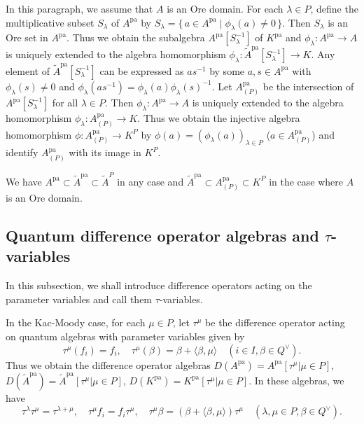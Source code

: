 \documentclass[12pt,twoside]{article}
\newcommand\bra{\langle}
\newcommand\ket{\rangle}
\newcommand\Qv{Q^\vee}
\newcommand\tA{{\widetilde A}}
\newcommand\pa{{\mathrm{pa}}}
\theoremstyle{plain} %
\theoremstyle{definition} %
\theoremstyle{definition} %
\numberwithin{theorem}{section}
\numberwithin{equation}{section}
\numberwithin{figure}{section}
\numberwithin{table}{section}
\begin{document}
In this paragraph, we assume that $A$ is an Ore domain.
For each $\lambda\in P$, 
define the multiplicative subset $S_\lambda$ of $A^\pa$ 
by $S_\lambda=\{\,a\in A^\pa\mid\phi_\lambda(a)\ne0\,\}$.
Then $S_\lambda$ is an Ore set in $A^\pa$.
Thus we obtain the subalgebra $A^\pa[S_\lambda^{-1}]$ of $K^\pa$
and $\phi_\lambda:A^\pa\to A$ is uniquely extended to 
the algebra homomorphism $\phi_\lambda:\tA^\pa[S_\lambda^{-1}]\to K$.
Any element of $\tA^\pa[S_\lambda^{-1}]$ can be expressed as 
$as^{-1}$ by some $a,s\in A^\pa$ with $\phi_\lambda(s)\ne 0$
and $\phi_\lambda(as^{-1})=\phi_\lambda(a)\phi_\lambda(s)^{-1}$.
Let $A^\pa_{(P)}$ be the intersection of $A^\pa[S_\lambda^{-1}]$
for all $\lambda\in P$. 
Then $\phi_\lambda:A^\pa\to A$ is uniquely extended to
the algebra homomorphism $\phi_\lambda: A^\pa_{(P)}\to K$.
Thus we obtain the injective algebra homomorphism 
$\phi:A^\pa_{(P)}\to K^P$ by $\phi(a)=(\phi_\lambda(a))_{\lambda\in P}$
($a\in A^\pa_{(P)}$)
and identify $A^\pa_{(P)}$ with its image in $K^P$.

We have $A^\pa\subset\tA^\pa\subset\tA^P$ in any case
and $\tA^\pa\subset A^\pa_{(P)}\subset K^P$
in the case where $A$ is an Ore domain.


\subsection{Quantum difference operator algebras and $\tau$-variables}
\label{sec:D(A^pa)}

In this subsection, we shall introduce difference operators acting on 
the parameter variables and call them $\tau$-variables.

In the Kac-Moody case, 
for each $\mu\in P$, let $\tau^\mu$ be the difference operator 
acting on quantum algebras with parameter variables given by
\begin{equation*}
 \tau^\mu(f_i) = f_i, \quad
 \tau^\mu(\beta) = \beta+\bra\beta,\mu\ket \quad
 (i\in I, \beta\in\Qv).
\end{equation*}
Thus we obtain the difference operator algebras
$D(A^\pa)=A^\pa[\tau^\mu|\mu\in P]$, 
$D(\tA^\pa)=\tA^\pa[\tau^\mu|\mu\in P]$, 
$D(K^\pa)=K^\pa[\tau^\mu|\mu\in P]$.
In these algebras, we have
\begin{equation*}
 \tau^\lambda\tau^\mu=\tau^{\lambda+\mu}, \quad
 \tau^\mu f_i = f_i\tau^\mu, \quad
 \tau^\mu \beta = (\beta+\bra\beta,\mu\ket)\tau^\mu \quad
 (\lambda,\mu\in P, \beta\in\Qv).
\end{equation*}
\end{document}
